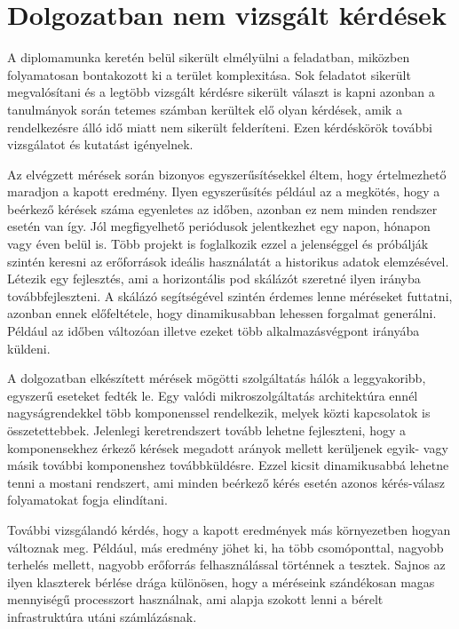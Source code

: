 \section{Dolgozatban nem vizsgált kérdések}
A diplomamunka keretén belül sikerült elmélyülni a feladatban, miközben folyamatosan bontakozott ki a terület komplexitása.
Sok feladatot sikerült megvalósítani és a legtöbb vizsgált kérdésre sikerült választ is kapni azonban a tanulmányok során tetemes számban kerültek elő olyan kérdések, amik a rendelkezésre álló idő miatt nem sikerült felderíteni.
Ezen kérdéskörök további vizsgálatot és kutatást igényelnek.

Az elvégzett mérések során bizonyos egyszerűsítésekkel éltem, hogy értelmezhető maradjon a kapott eredmény.
Ilyen egyszerűsítés például az a megkötés, hogy a beérkező kérések száma egyenletes az időben, azonban ez nem minden rendszer esetén van így.
Jól megfigyelhető periódusok jelentkezhet egy napon, hónapon vagy éven belül is.
Több projekt is foglalkozik ezzel a jelenséggel és próbálják szintén keresni az erőforrások ideális használatát a historikus adatok elemzésével.
Létezik egy fejlesztés, ami a horizontális pod skálázót szeretné ilyen irányba továbbfejleszteni\citep{predictiveHPAGithub}.
A skálázó segítségével szintén érdemes lenne méréseket futtatni, azonban ennek előfeltétele, hogy dinamikusabban lehessen forgalmat generálni.
Például az időben változóan illetve ezeket több alkalmazásvégpont irányába küldeni.

A dolgozatban elkészített mérések mögötti szolgáltatás hálók a leggyakoribb, egyszerű eseteket fedték le.
Egy valódi mikroszolgáltatás architektúra ennél nagyságrendekkel több komponenssel rendelkezik, melyek közti kapcsolatok is összetettebbek.
Jelenlegi keretrendszert tovább lehetne fejleszteni, hogy a komponensekhez érkező kérések megadott arányok mellett kerüljenek egyik- vagy másik további komponenshez továbbküldésre.
Ezzel kicsit dinamikusabbá lehetne tenni a mostani rendszert, ami minden beérkező kérés esetén azonos kérés-válasz folyamatokat fogja elindítani.

További vizsgálandó kérdés, hogy a kapott eredmények más környezetben hogyan változnak meg.
Például, más eredmény jöhet ki, ha több csomóponttal, nagyobb terhelés mellett, nagyobb erőforrás felhasználással történnek a tesztek.
Sajnos az ilyen klaszterek bérlése drága különösen, hogy a méréseink szándékosan magas mennyiségű processzort használnak, ami alapja szokott lenni a bérelt infrastruktúra utáni számlázásnak.


